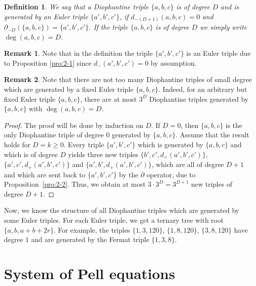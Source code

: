 \documentclass{amsart}
\newtheorem*{definition}{Definition}
\theoremstyle{definition}
\newtheorem{remark}{Remark}[section]
\begin{document}
\begin{definition}
We say that a Diophantine triple $\{a,b,c\}$ is of {\textit{degree}} $D$ and is {\textit{generated}} by an Euler triple
$\{a',b',c'\}$, if $d_{-(D+1)}(a,b,c)=0$ and $\partial_{-D}(\{a,b,c\})=\{a',b',c'\}$. If the triple $\{a,b,c\}$ is of degree $D$ we simply write $\deg(a,b,c)=D$. 
\end{definition} 

\begin{remark}
 Note that in the definition the triple $\{a',b',c'\}$ is an Euler triple due to Proposition \ref{pro:2-1} since $d_-(a',b',c')=0$ by assumption.
\end{remark}

\begin{remark} 
Note that there are not too many Diophantine triples of small degree which are generated by a fixed Euler triple $\{a,b,c\}$.
Indeed, for an arbitrary but fixed Euler triple $\{a,b,c\}$, there are at most $3^{D}$ Diophantine triples generated by $\{a,b,c\}$ with $\deg(a,b,c)= D$. 
\end{remark}

\begin{proof}
The proof will be done by induction on $D$. If $D=0$, then $\{a,b,c\}$ is the only Diophantine triple of degree $0$ generated by $\{a,b,c\}$.
Assume that the result holds
for $D=k\ge 0$. Every triple $\{a',b',c'\}$ which is generated by $\{a,b,c\}$ and which is of degree $D$ yields three new triples 
$\{b',c',d_{+}(a',b',c')\}$, $\{a',c',d_{+}(a',b',c')\}$ and $\{a',b',d_{+}(a',b',c')\}$, which are all of degree $D+1$ and which are sent back 
to $\{a',b',c'\}$ by the $\partial$ operator, due to Proposition~\ref{pro:2-2}. Thus, we obtain at most $3\cdot 3^D=3^{D+1}$ new triples of degree $D+1$.
\end{proof}



Now, we know the structure of all Diophantine triples which are generated by some Euler triples. 
For each Euler triple, we get a ternary tree with root $\{a,b,a+b+2r\}$. For example, the triples
$\{1,3,120\}$, $\{1,8,120\}$, $\{3,8,120\}$ have degree $1$ and are generated by the Fermat triple $\{1,3,8\}$. 


\section{System of Pell equations}\label{sec:4}
\end{document}
